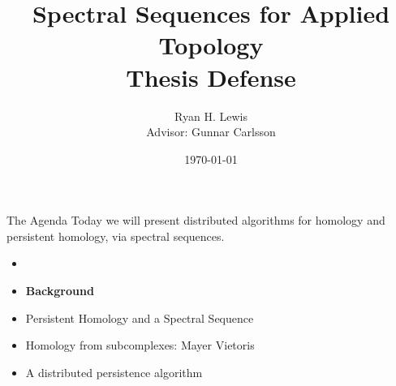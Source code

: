 \documentclass{beamer}
\title{Spectral Sequences for Applied Topology \\ Thesis Defense}
\author{Ryan H. Lewis \vspace{.5cm} \\ Advisor:  Gunnar Carlsson}
\date{\today}
\begin{document}
\frame{\titlepage}
\begin{frame}{The Agenda}
Today we will present distributed algorithms for homology and persistent homology, via spectral sequences.
\begin{minipage}{.65\textwidth}
\begin{itemize}
\item {\color{gray}{Motivation}}
\item \textbf{Background}
\item Persistent Homology and a Spectral Sequence
\item Homology from subcomplexes: Mayer Vietoris 
\item A distributed persistence algorithm
\end{itemize}
\end{minipage}
\end{frame}






\end{document}
